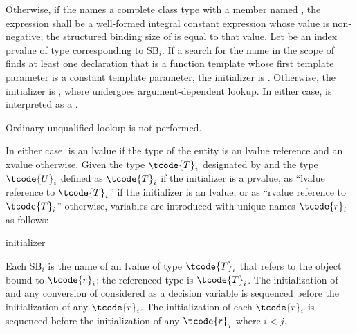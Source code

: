 \pnum
Otherwise, if
the  
names a complete class type with a member named ,
the expression 
shall be a well-formed integral constant expression
whose value is non-negative;
the structured binding size of  is equal to that value.
Let  be an index prvalue of type 
corresponding to $\textrm{SB}_i$.
If a search for the name 
in the scope of 
finds at least one declaration
that is a function template whose first template parameter
is a constant template parameter,
the initializer is
. Otherwise, the initializer is ,
where  undergoes argument-dependent lookup.
In either case,  is interpreted as a .
\begin{note}
Ordinary unqualified lookup is not performed.
\end{note}
In either case,  is an lvalue if the type of the entity 
is an lvalue reference and an xvalue otherwise.
Given the type $\tcode{T}_i$ designated by
 and
the type $\tcode{U}_i$ defined
as $\tcode{T}_i$ if the initializer is a prvalue,
as ``lvalue reference to $\tcode{T}_i$'' if the initializer is an lvalue, or
as ``rvalue reference to $\tcode{T}_i$'' otherwise,
variables are introduced with unique names $\tcode{r}_i$ as follows:

\begin{ncbnf}
  initializer \terminal{;}
\end{ncbnf}

Each $\textrm{SB}_i$ is the name of an lvalue of type $\tcode{T}_i$
that refers to the object bound to $\tcode{r}_i$;
the referenced type is $\tcode{T}_i$.
The initialization of  and
any conversion of  considered as a decision variable
is
sequenced before the initialization of any $\tcode{r}_i$.
The initialization of each $\tcode{r}_i$ is
sequenced before the initialization of any $\tcode{r}_j$ where $i < j$.

